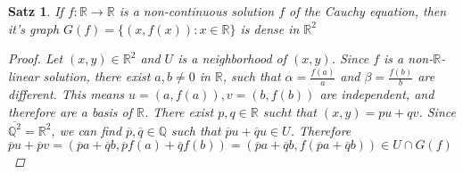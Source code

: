 \documentclass[headsepline=true,DIV=11]{scrartcl}
\newtheorem*{theorem}{Satz}
\theoremstyle{definition}
\renewcommand{\bar}[1]{\overline{#1}}
\begin{document}
\begin{theorem}
	If $f\colon \mathbb R\to\mathbb R$ is a non-continuous solution $f$ of the Cauchy equation, then it's graph $G(f)=\{(x, f(x))\colon x\in \mathbb R\}$ is dense in $\mathbb R^2$
	\begin{proof}
		Let $(x,y)\in \mathbb R^2$ and $U$ is a neighborhood of $(x,y)$.
		Since $f$ is a non-$\mathbb R$-linear solution, there exist $a,b\neq 0$ in $\mathbb R$, such that $\alpha=\frac{f(a)}{a}$ and $\beta= \frac{f(b)}{b}$ are different.
		This means $u=(a,f(a)), v=(b,f(b))$ are independent, and therefore are a basis of $\mathbb R$.
		There exist $p,q\in \mathbb R$ sucht that $(x,y)=pu+qv$.
		Since $\bar{\mathbb Q^2}= \mathbb R^2$, we can find $\bar p, \bar q \in \mathbb Q$ such that $\bar pu+\bar qu \in U$. 
		Therefore $\bar pu+\bar pv= (\bar pa + \bar qb, \bar pf(a)+\bar qf(b)) = (\bar pa+\bar qb, f(\bar pa+ \bar qb))\in U\cap G(f)$
	\end{proof}
\end{theorem}
\end{document}
